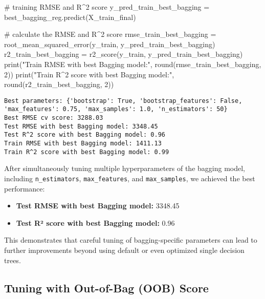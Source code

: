 \documentclass[
  letterpaper,
  DIV=11,
  numbers=noendperiod]{scrreprt}
\newenvironment{Shaded}{\begin{snugshade}}{\end{snugshade}}
\newcommand{\BuiltInTok}[1]{\textcolor[rgb]{0.00,0.23,0.31}{#1}}
\newcommand{\CommentTok}[1]{\textcolor[rgb]{0.37,0.37,0.37}{#1}}
\newcommand{\DecValTok}[1]{\textcolor[rgb]{0.68,0.00,0.00}{#1}}
\newcommand{\NormalTok}[1]{\textcolor[rgb]{0.00,0.23,0.31}{#1}}
\newcommand{\OperatorTok}[1]{\textcolor[rgb]{0.37,0.37,0.37}{#1}}
\newcommand{\StringTok}[1]{\textcolor[rgb]{0.13,0.47,0.30}{#1}}
\providecommand{\tightlist}{%
  \setlength{\itemsep}{0pt}\setlength{\parskip}{0pt}}\usepackage{longtable,booktabs,array}
\begin{document}
\begin{Shaded}
\begin{Highlighting}[]
\CommentTok{\# training RMSE and R\^{}2 score}
\NormalTok{y\_pred\_train\_best\_bagging }\OperatorTok{=}\NormalTok{ best\_bagging\_reg.predict(X\_train\_final)}

\CommentTok{\# calculate the RMSE and R\^{}2 score}
\NormalTok{rmse\_train\_best\_bagging }\OperatorTok{=}\NormalTok{ root\_mean\_squared\_error(y\_train, y\_pred\_train\_best\_bagging)}
\NormalTok{r2\_train\_best\_bagging }\OperatorTok{=}\NormalTok{ r2\_score(y\_train, y\_pred\_train\_best\_bagging)}
\BuiltInTok{print}\NormalTok{(}\StringTok{"Train RMSE with best Bagging model:"}\NormalTok{, }\BuiltInTok{round}\NormalTok{(rmse\_train\_best\_bagging, }\DecValTok{2}\NormalTok{))}
\BuiltInTok{print}\NormalTok{(}\StringTok{"Train R\^{}2 score with best Bagging model:"}\NormalTok{, }\BuiltInTok{round}\NormalTok{(r2\_train\_best\_bagging, }\DecValTok{2}\NormalTok{))}
\end{Highlighting}
\end{Shaded}

\begin{verbatim}
Best parameters: {'bootstrap': True, 'bootstrap_features': False, 'max_features': 0.75, 'max_samples': 1.0, 'n_estimators': 50}
Best RMSE cv score: 3288.03
Test RMSE with best Bagging model: 3348.45
Test R^2 score with best Bagging model: 0.96
Train RMSE with best Bagging model: 1411.13
Train R^2 score with best Bagging model: 0.99
\end{verbatim}

After simultaneously tuning multiple hyperparameters of the bagging
model, including \texttt{n\_estimators}, \texttt{max\_features}, and
\texttt{max\_samples}, we achieved the best performance:

\begin{itemize}
\tightlist
\item
  \textbf{Test RMSE with best Bagging model:} 3348.45\\
\item
  \textbf{Test R² score with best Bagging model:} 0.96
\end{itemize}

This demonstrates that careful tuning of bagging-specific parameters can
lead to further improvements beyond using default or even optimized
single decision trees.

\subsection{Tuning with Out-of-Bag (OOB)
Score}\label{tuning-with-out-of-bag-oob-score}
\end{document}
